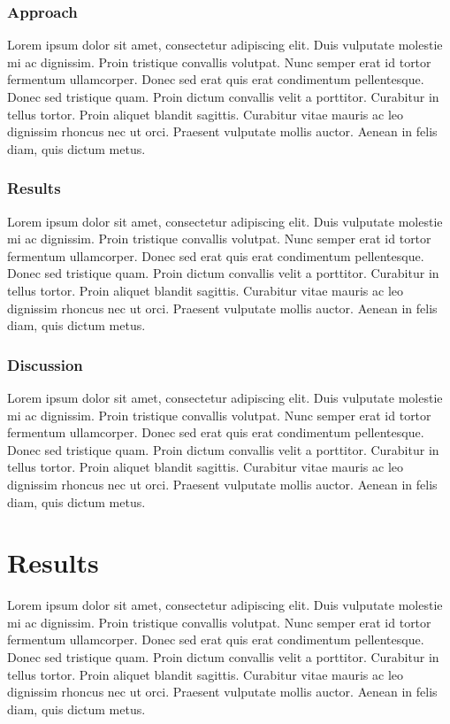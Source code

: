 \documentclass[11pt]{article}
\begin{document}
\subsubsection{Approach}
Lorem ipsum dolor sit amet, consectetur adipiscing elit. Duis vulputate molestie mi ac dignissim. Proin tristique convallis volutpat. Nunc semper erat id tortor fermentum ullamcorper. Donec sed erat quis erat condimentum pellentesque. Donec sed tristique quam. Proin dictum convallis velit a porttitor. Curabitur in tellus tortor. Proin aliquet blandit sagittis. Curabitur vitae mauris ac leo dignissim rhoncus nec ut orci. Praesent vulputate mollis auctor. Aenean in felis diam, quis dictum metus.

\subsubsection{Results}
Lorem ipsum dolor sit amet, consectetur adipiscing elit. Duis vulputate molestie mi ac dignissim. Proin tristique convallis volutpat. Nunc semper erat id tortor fermentum ullamcorper. Donec sed erat quis erat condimentum pellentesque. Donec sed tristique quam. Proin dictum convallis velit a porttitor. Curabitur in tellus tortor. Proin aliquet blandit sagittis. Curabitur vitae mauris ac leo dignissim rhoncus nec ut orci. Praesent vulputate mollis auctor. Aenean in felis diam, quis dictum metus.

\subsubsection{Discussion}
Lorem ipsum dolor sit amet, consectetur adipiscing elit. Duis vulputate molestie mi ac dignissim. Proin tristique convallis volutpat. Nunc semper erat id tortor fermentum ullamcorper. Donec sed erat quis erat condimentum pellentesque. Donec sed tristique quam. Proin dictum convallis velit a porttitor. Curabitur in tellus tortor. Proin aliquet blandit sagittis. Curabitur vitae mauris ac leo dignissim rhoncus nec ut orci. Praesent vulputate mollis auctor. Aenean in felis diam, quis dictum metus.



\section{Results}
Lorem ipsum dolor sit amet, consectetur adipiscing elit. Duis vulputate molestie mi ac dignissim. Proin tristique convallis volutpat. Nunc semper erat id tortor fermentum ullamcorper. Donec sed erat quis erat condimentum pellentesque. Donec sed tristique quam. Proin dictum convallis velit a porttitor. Curabitur in tellus tortor. Proin aliquet blandit sagittis. Curabitur vitae mauris ac leo dignissim rhoncus nec ut orci. Praesent vulputate mollis auctor. Aenean in felis diam, quis dictum metus.
\end{document}
